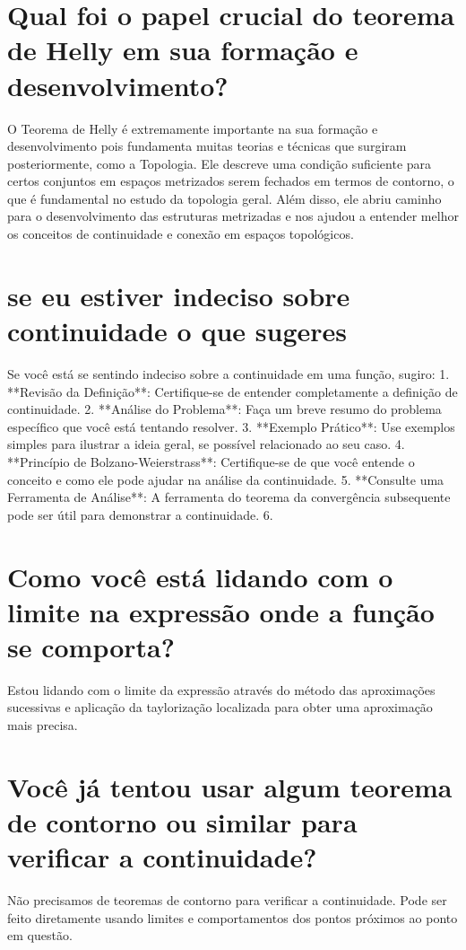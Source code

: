 \documentclass[11pt,a4paper]{article}
\begin{document}
\section{Qual foi o papel crucial do teorema de Helly em sua formação e desenvolvimento?}
O Teorema de Helly é extremamente importante na sua formação e desenvolvimento pois fundamenta muitas teorias e técnicas que surgiram posteriormente, como a Topologia. Ele descreve uma condição suficiente para certos conjuntos em espaços metrizados serem fechados em termos de contorno, o que é fundamental no estudo da topologia geral. Além disso, ele abriu caminho para o desenvolvimento das estruturas metrizadas e nos ajudou a entender melhor os conceitos de continuidade e conexão em espaços topológicos.

\section{se eu estiver indeciso sobre continuidade o que sugeres}
Se você está se sentindo indeciso sobre a continuidade em uma função, sugiro: 1. **Revisão da Definição**: Certifique-se de entender completamente a definição de continuidade. 2. **Análise do Problema**: Faça um breve resumo do problema específico que você está tentando resolver. 3. **Exemplo Prático**: Use exemplos simples para ilustrar a ideia geral, se possível relacionado ao seu caso. 4. **Princípio de Bolzano-Weierstrass**: Certifique-se de que você entende o conceito e como ele pode ajudar na análise da continuidade. 5. **Consulte uma Ferramenta de Análise**: A ferramenta do teorema da convergência subsequente pode ser útil para demonstrar a continuidade. 6.

\section{Como você está lidando com o limite na expressão onde a função se comporta?}
Estou lidando com o limite da expressão através do método das aproximações sucessivas e aplicação da taylorização localizada para obter uma aproximação mais precisa.

\section{Você já tentou usar algum teorema de contorno ou similar para verificar a continuidade?}
Não precisamos de teoremas de contorno para verificar a continuidade. Pode ser feito diretamente usando limites e comportamentos dos pontos próximos ao ponto em questão.
\end{document}
